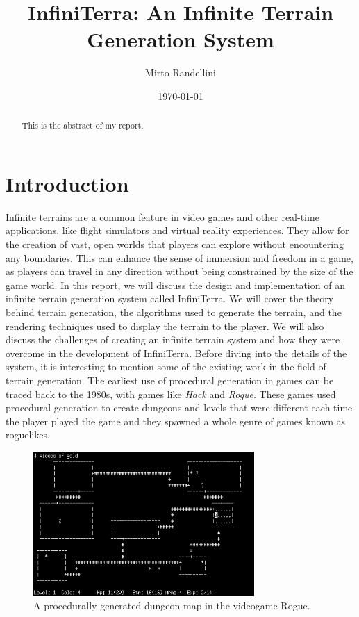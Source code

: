 \documentclass{report}
\title{InfiniTerra: An Infinite Terrain Generation System}
\author{Mirto Randellini}
\date{\today}
\begin{document}
\maketitle

\tableofcontents

\begin{abstract}
	This is the abstract of my report.
\end{abstract}

\chapter{Introduction}
\label{ch:introduction}
Infinite terrains are a common feature in video games and other real-time applications, like flight
simulators and virtual reality experiences. They allow for the creation of vast, open worlds that
players can explore without encountering any boundaries. This can enhance the sense of immersion
and freedom in a game, as players can travel in any direction without being constrained by the size
of the game world. In this report, we will discuss the design and implementation of an infinite
terrain generation system called InfiniTerra. We will cover the theory behind terrain generation,
the algorithms used to generate the terrain, and the rendering techniques used to display the
terrain to the player. We will also discuss the challenges of creating an infinite terrain system
and how they were overcome in the development of InfiniTerra.
Before diving into the details of the system, it is interesting to mention some of the existing
work in the field of terrain generation. The earliest use of procedural generation in games can be
traced back to the 1980s, with games like \textit{Hack} and \textit{Rogue}. These games used
procedural generation to create dungeons and levels that were different each time the player played
the game and they spawned a whole genre of games known as roguelikes.

\begin{figure}[h!]
	\centering
	\includegraphics[width=0.75\textwidth]{img/rogue.png}
	\caption{A procedurally generated dungeon map in the videogame Rogue.}
	\label{fig:nethack}
\end{figure}
\end{document}
